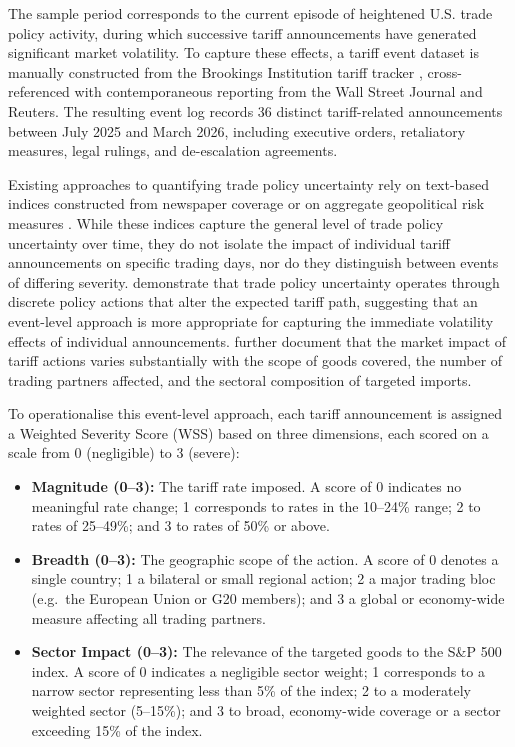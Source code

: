 \documentclass[12pt,a4paper]{report}
\begin{document}
The sample period corresponds to the current episode of heightened U.S. trade policy activity, during which successive tariff announcements have generated significant market volatility. To capture these effects, a tariff event dataset is manually constructed from the Brookings Institution tariff tracker \citep{Brookings2025}, cross-referenced with contemporaneous reporting from the Wall Street Journal and Reuters. The resulting event log records 36 distinct tariff-related announcements between July 2025 and March 2026, including executive orders, retaliatory measures, legal rulings, and de-escalation agreements.

Existing approaches to quantifying trade policy uncertainty rely on text-based indices constructed from newspaper coverage \citep{BakerBloomDavis2016} or on aggregate geopolitical risk measures \citep{CaldaraIacoviello2022}. While these indices capture the general level of trade policy uncertainty over time, they do not isolate the impact of individual tariff announcements on specific trading days, nor do they distinguish between events of differing severity. \citet{HandleyLimao2017} demonstrate that trade policy uncertainty operates through discrete policy actions that alter the expected tariff path, suggesting that an event-level approach is more appropriate for capturing the immediate volatility effects of individual announcements. \citet{FajgelbaumKhandelwal2022} further document that the market impact of tariff actions varies substantially with the scope of goods covered, the number of trading partners affected, and the sectoral composition of targeted imports.

To operationalise this event-level approach, each tariff announcement is assigned a Weighted Severity Score (WSS) based on three dimensions, each scored on a scale from 0 (negligible) to 3 (severe):

\begin{itemize}
    \item \textbf{Magnitude (0--3):} The tariff rate imposed. A score of 0 indicates no meaningful rate change; 1 corresponds to rates in the 10--24\% range; 2 to rates of 25--49\%; and 3 to rates of 50\% or above.
    \item \textbf{Breadth (0--3):} The geographic scope of the action. A score of 0 denotes a single country; 1 a bilateral or small regional action; 2 a major trading bloc (e.g.\ the European Union or G20 members); and 3 a global or economy-wide measure affecting all trading partners.
    \item \textbf{Sector Impact (0--3):} The relevance of the targeted goods to the S\&P 500 index. A score of 0 indicates a negligible sector weight; 1 corresponds to a narrow sector representing less than 5\% of the index; 2 to a moderately weighted sector (5--15\%); and 3 to broad, economy-wide coverage or a sector exceeding 15\% of the index.
\end{itemize}
\end{document}
